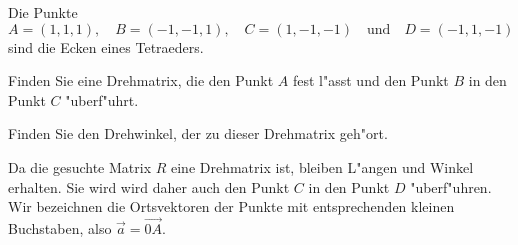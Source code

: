 Die Punkte
\[
A=( 1, 1, 1),\quad
B=(-1,-1, 1),\quad
C=( 1,-1,-1)
\quad\text{und}\quad
D=(-1, 1,-1)
\]
sind die Ecken eines Tetraeders.
\begin{teilaufgaben}
\item
Finden Sie eine Drehmatrix, die den Punkt $A$ fest l"asst und den
Punkt $B$ in den Punkt $C$ "uberf"uhrt.
\item
Finden Sie den Drehwinkel, der zu dieser Drehmatrix geh"ort.
\end{teilaufgaben}

\begin{loesung}
\begin{teilaufgaben}
\item
Da die gesuchte Matrix $R$ eine Drehmatrix ist, bleiben L"angen und
Winkel erhalten.
Sie wird wird daher auch den Punkt $C$ in den Punkt $D$ "uberf"uhren.
Wir bezeichnen die Ortsvektoren der Punkte mit entsprechenden kleinen
Buchstaben, also $\vec{a}=\overrightarrow{0A}$.


\end{teilaufgaben}
\end{loesung}
